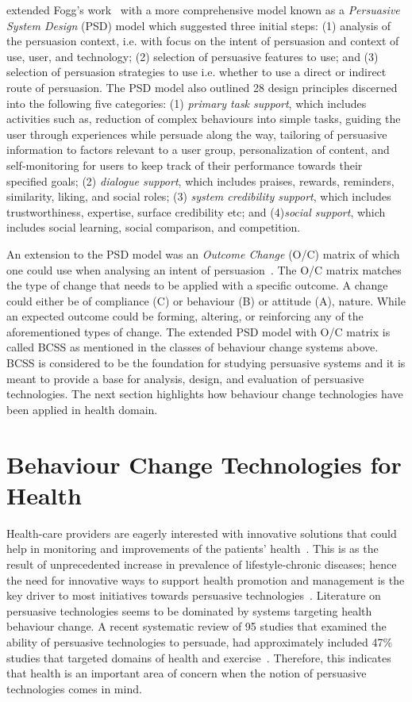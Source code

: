 \cite{Oinas-kukkonen:psd} extended Fogg's work~\citep{fogg2009behavior} with a more comprehensive model known as a \emph{Persuasive System Design} (PSD) model which suggested three initial steps: (1) analysis of the persuasion context, i.e. with focus on the intent of persuasion and context of use, user, and technology; (2) selection of persuasive features to use; and (3) selection of persuasion strategies to use i.e. whether to use a direct or indirect route of persuasion. The PSD model also outlined 28 design principles discerned into the following five categories: (1) \emph{primary task support}, which includes activities such as, reduction of complex behaviours into simple tasks, guiding the user through experiences while persuade along the way, tailoring of persuasive information to factors relevant to a user group, personalization of content, and self-monitoring for users to keep track of their performance towards their specified goals; (2) \emph{dialogue support}, which includes praises, rewards, reminders, similarity, liking, and social roles; (3) \emph{system credibility support}, which includes trustworthiness, expertise, surface credibility etc; and (4)\emph{social support}, which includes social learning, social comparison, and competition.

An extension to the PSD model was an \emph{Outcome Change} (O/C) matrix of which one could use when analysing an intent of persuasion~\citep{Oinas-Kukkonen:foundation}. The O/C matrix matches the type of change that needs to be applied with a specific outcome. A change could either be of compliance (C) or behaviour (B) or attitude (A), nature. While an expected outcome could be forming, altering, or reinforcing any of the aforementioned types of change. The extended PSD model with O/C matrix is called BCSS as mentioned in the classes of behaviour change systems above. BCSS is considered to be the foundation for studying persuasive systems and it is meant to provide a base for analysis, design, and evaluation of persuasive technologies. The next section highlights how behaviour change technologies have been applied in health domain.

\section{Behaviour Change Technologies for Health}
Health-care providers are eagerly interested with innovative solutions that could help in monitoring and improvements of the patients' health~\citep{higgins2016smartphone}. This is as the result of unprecedented increase in prevalence of lifestyle-chronic diseases; hence the need for innovative ways to support health promotion and management is the key driver to most initiatives towards persuasive technologies~\citep{arsand:mobile}. Literature on persuasive technologies seems to be dominated by systems targeting health behaviour change. A recent systematic review of 95 studies that examined the ability of persuasive technologies to persuade, had approximately included 47\% studies that  targeted domains of health and exercise~\citep{hamari2014persuasive}. Therefore, this indicates that health is an important area of concern when the notion of persuasive technologies comes in mind.

